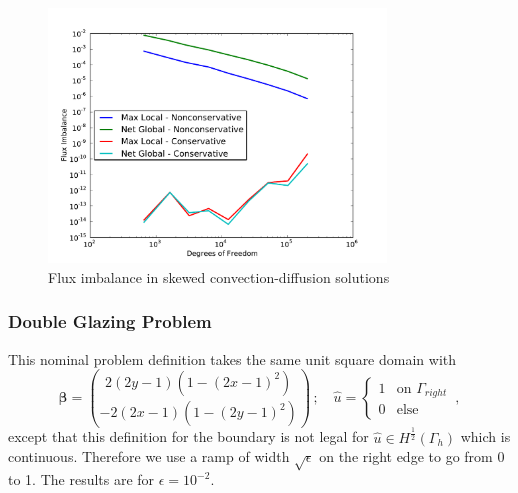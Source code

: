 \documentclass[letterpaper]{article}
\def\bbeta{\boldsymbol\beta}
\begin{document}
\begin{figure}[h!]
\centering
\includegraphics[width=0.8\textwidth]{figs/Confusion/modifiedFlux.pdf}
\caption{Flux imbalance in skewed convection-diffusion solutions}
\label{fig:confusionFlux}
\end{figure}

\subsubsection{Double Glazing Problem}
This nominal problem definition takes the same unit square domain with 
\[
\bbeta=\binom{2(2y-1)(1-(2x-1)^2)}{-2(2x-1)(1-(2y-1)^2)}\,;\quad
\hat u=
\begin{cases}
1 & \mbox{on }\Gamma_{right}\\
0 & \mbox{else }
\end{cases}\,,
\]
except that this definition for the boundary is not legal for $\hat u\in
H^{\frac{1}{2}}(\Gamma_h)$ which is continuous. Therefore we use a ramp of
width $\sqrt{\epsilon}$ on the right edge to go from 0 to 1. The 
results are for $\epsilon=10^{-2}$.
\end{document}
